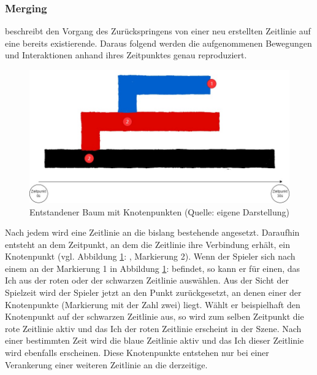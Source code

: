 \subsubsection{Merging}\label{sec:merge}
 beschreibt den Vorgang des Zurückspringens von einer neu erstellten Zeitlinie auf eine bereits existierende. Daraus folgend werden die aufgenommenen Bewegungen und Interaktionen anhand ihres Zeitpunktes genau reproduziert.
\begin{figure}[ht]
\centering
\includegraphics[width=1\linewidth]{content/pictures/merge_definition_grafik.jpg}
\caption{Entstandener Baum mit Knotenpunkten (Quelle: eigene Darstellung)}
\label{fig:merge-definition}
\end{figure}
Nach jedem  wird eine  Zeitlinie an die bislang bestehende angesetzt. Daraufhin entsteht an dem Zeitpunkt, an dem die Zeitlinie ihre Verbindung erhält, ein Knotenpunkt (vgl. Abbildung \ref{fig:merge-definition}: , Markierung 2). Wenn der Spieler sich nach einem  an der Markierung 1 in Abbildung \ref{fig:merge-definition}:  befindet, so kann er für einen,  das Ich aus der roten oder der schwarzen Zeitlinie auswählen. Aus der Sicht der Spielzeit wird der Spieler jetzt an den Punkt zurückgesetzt, an denen einer der Knotenpunkte (Markierung mit der Zahl zwei) liegt. Wählt er beispielhaft den Knotenpunkt auf der schwarzen Zeitlinie aus, so wird zum selben Zeitpunkt die rote Zeitlinie aktiv und das Ich der roten Zeitlinie erscheint in der Szene. Nach einer bestimmten Zeit wird die blaue Zeitlinie aktiv und das Ich dieser Zeitlinie wird ebenfalls erscheinen. Diese Knotenpunkte entstehen nur bei einer Verankerung einer weiteren Zeitlinie an die derzeitige. 

